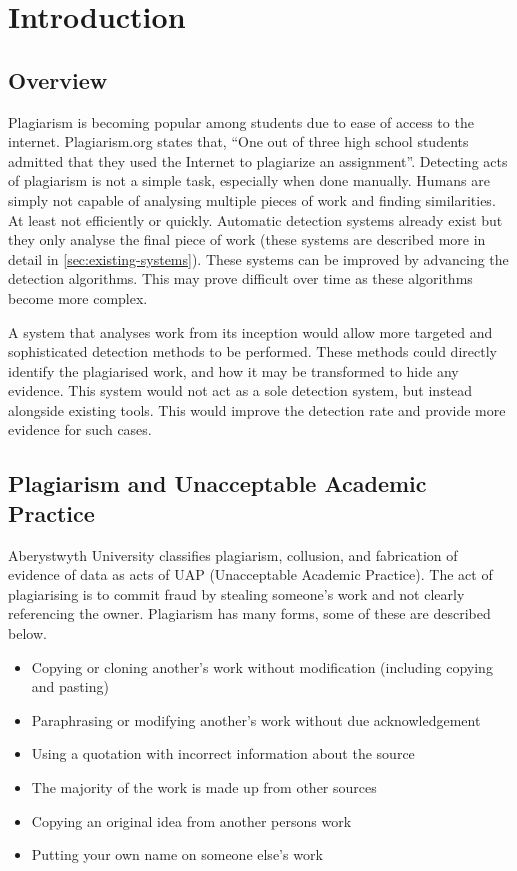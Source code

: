 \chapter{Introduction}
\section{Overview}
Plagiarism is becoming popular among students due to ease of access to the internet. Plagiarism.org states that, ``One out of three high school students admitted that they used the Internet to plagiarize an assignment''\cite{PlagiarismorgFacts}. Detecting acts of plagiarism is not a simple task, especially when done manually. Humans are simply not capable of analysing multiple pieces of work and finding similarities. At least not efficiently or quickly. Automatic detection systems already exist but they only analyse the final piece of work (these systems are described more in detail in \autoref{sec:existing-systems}). These systems can be improved by advancing the detection algorithms. This may prove difficult over time as these algorithms become more complex.

A system that analyses work from its inception would allow more targeted and sophisticated detection methods to be performed. These methods could directly identify the plagiarised work, and how it may be transformed to hide any evidence. This system would not act as a sole detection system, but instead alongside existing tools. This would improve the detection rate and provide more evidence for such cases.

\section{Plagiarism and Unacceptable Academic Practice}
Aberystwyth University classifies plagiarism, collusion, and fabrication of evidence of data as acts of UAP (Unacceptable Academic Practice)\cite{AberUniUAP}. The act of plagiarising is to commit fraud by stealing someone's work and not clearly referencing the owner\cite{PlagiarismorgWhat}. Plagiarism has many forms, some of these are described below\cite{AberUniUAP}\cite{PlagiarismorgWhat}\cite{TurnitinPlagiarismSpectrum}\cite{Clough03oldand}.

\begin{itemize}
  \item Copying or cloning another's work without modification (including copying and pasting)
  \item Paraphrasing or modifying another's work without due acknowledgement
  \item Using a quotation with incorrect information about the source
  \item The majority of the work is made up from other sources
  \item Copying an original idea from another persons work
  \item Putting your own name on someone else's work  
\end{itemize}

